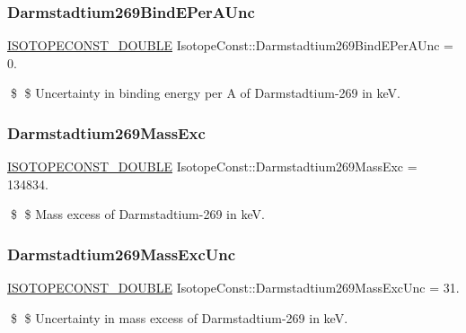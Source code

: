 \subsubsection{\texorpdfstring{Darmstadtium269\+Bind\+E\+Per\+A\+Unc}{Darmstadtium269BindEPerAUnc}}
{\footnotesize\ttfamily \mbox{\hyperlink{group___isotope_const-_macros_ga8f45a7272ce02c0b4c65c44636ed719a}{I\+S\+O\+T\+O\+P\+E\+C\+O\+N\+S\+T\+\_\+\+D\+O\+U\+B\+LE}} Isotope\+Const\+::\+Darmstadtium269\+Bind\+E\+Per\+A\+Unc = 0.}

\$ \$ Uncertainty in binding energy per A of Darmstadtium-\/269 in keV. \mbox{\label{group___isotope_const-_darmstadtium-_ds269_ga31857866aa264f8e3c61b894ee1acc8d}} 
\subsubsection{\texorpdfstring{Darmstadtium269\+Mass\+Exc}{Darmstadtium269MassExc}}
{\footnotesize\ttfamily \mbox{\hyperlink{group___isotope_const-_macros_ga8f45a7272ce02c0b4c65c44636ed719a}{I\+S\+O\+T\+O\+P\+E\+C\+O\+N\+S\+T\+\_\+\+D\+O\+U\+B\+LE}} Isotope\+Const\+::\+Darmstadtium269\+Mass\+Exc = 134834.}

\$ \$ Mass excess of Darmstadtium-\/269 in keV. \mbox{\label{group___isotope_const-_darmstadtium-_ds269_ga2e55c2bdc8bd2f21dbb39f91a6175835}} 
\subsubsection{\texorpdfstring{Darmstadtium269\+Mass\+Exc\+Unc}{Darmstadtium269MassExcUnc}}
{\footnotesize\ttfamily \mbox{\hyperlink{group___isotope_const-_macros_ga8f45a7272ce02c0b4c65c44636ed719a}{I\+S\+O\+T\+O\+P\+E\+C\+O\+N\+S\+T\+\_\+\+D\+O\+U\+B\+LE}} Isotope\+Const\+::\+Darmstadtium269\+Mass\+Exc\+Unc = 31.}

\$ \$ Uncertainty in mass excess of Darmstadtium-\/269 in keV. \mbox{\label{group___isotope_const-_darmstadtium-_ds269_ga5da5e5bb6105532c7fae84515901b6d7}} 
